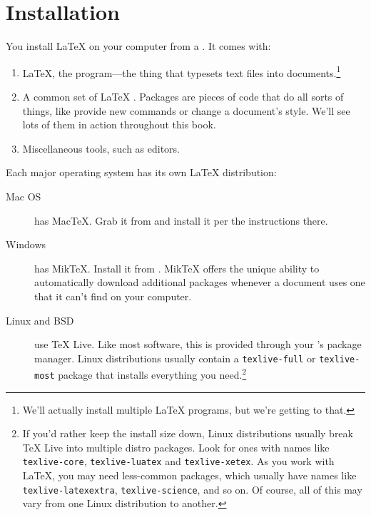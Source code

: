 \chapter{Installation}
\label{installation}

You install \LaTeX{} on your computer from a .
It comes with:
\begin{enumerate}
\item \LaTeX, the program---the thing that typesets text files into
    documents.\footnote{We'll actually install multiple \LaTeX{} programs,
    but we're getting to that.}
\item A common set of \LaTeX{} .
    Packages are pieces of code that do all sorts of things,
    like provide new commands or change a document's style.
    We'll see lots of them in action throughout this book.
\item Miscellaneous tools, such as editors.
\end{enumerate}
Each major operating system has its own \LaTeX{} distribution:
\begin{description}
\item[Mac OS] has Mac\TeX. Grab it from 
    and install it per the instructions there.

\item[Windows] has Mik\TeX.
    Install it from .
    Mik\TeX{} offers the unique ability to automatically download
    additional packages whenever a document uses one that it can't find
    on your computer.

\item[Linux and BSD] use \TeX{} Live.
    Like most software, this is provided through your
    's package manager.
    Linux distributions usually contain a \texttt{texlive-\allowbreak full}
    or \texttt{texlive-\allowbreak most} package that installs everything
    you need.\punckern\footnote{%
    If you'd rather keep the install size down,
    Linux distributions usually break \TeX{} Live into multiple distro packages.
    Look for ones with names like
    \texttt{texlive-\allowbreak core}, \texttt{texlive-\allowbreak luatex}
    and \texttt{texlive-\allowbreak xetex}.
    As you work with \LaTeX, you may need less-common packages,
    which usually have names like \texttt{texlive-\allowbreak latexextra},
    \texttt{texlive-\allowbreak science}, and so on.
    Of course, all of this may vary from one Linux distribution to another.}
\end{description}

